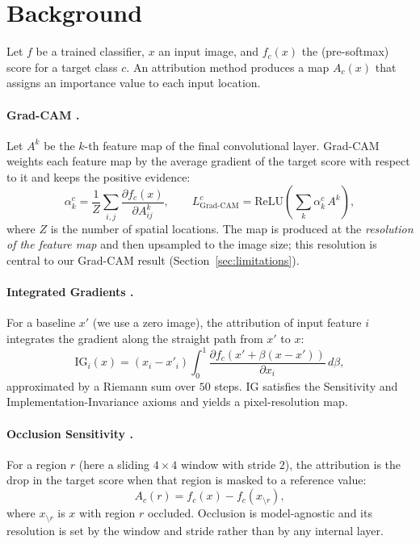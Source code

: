 \documentclass[11pt]{article}
\begin{document}
\section{Background}
\label{sec:background}
Let $f$ be a trained classifier, $x$ an input image, and $f_c(x)$ the (pre-softmax) score for a
target class $c$. An attribution method produces a map $A_c(x)$ that assigns an importance value to
each input location.

\paragraph{Grad-CAM \citep{selvaraju2017gradcam}.} Let $A^k$ be the $k$-th feature map of the final
convolutional layer. Grad-CAM weights each feature map by the average gradient of the target score
with respect to it and keeps the positive evidence:
\begin{equation}
\alpha_k^c = \frac{1}{Z}\sum_{i,j}\frac{\partial f_c(x)}{\partial A^k_{ij}},
\qquad
L^c_{\text{Grad-CAM}} = \mathrm{ReLU}\!\left(\sum_k \alpha_k^c\, A^k\right),
\end{equation}
where $Z$ is the number of spatial locations. The map is produced at the \emph{resolution of the
feature map} and then upsampled to the image size; this resolution is central to our Grad-CAM
result (Section~\ref{sec:limitations}).

\paragraph{Integrated Gradients \citep{sundararajan2017axiomatic}.} For a baseline $x'$ (we use a
zero image), the attribution of input feature $i$ integrates the gradient along the straight path
from $x'$ to $x$:
\begin{equation}
\mathrm{IG}_i(x) = (x_i - x'_i)\int_{0}^{1}
\frac{\partial f_c\!\left(x' + \beta (x - x')\right)}{\partial x_i}\, d\beta,
\end{equation}
approximated by a Riemann sum over $50$ steps. IG satisfies the Sensitivity and
Implementation-Invariance axioms and yields a pixel-resolution map.

\paragraph{Occlusion Sensitivity \citep{zeiler2014visualizing}.} For a region $r$ (here a sliding
$4\times4$ window with stride $2$), the attribution is the drop in the target score when that region
is masked to a reference value:
\begin{equation}
A_c(r) = f_c(x) - f_c\!\left(x_{\setminus r}\right),
\end{equation}
where $x_{\setminus r}$ is $x$ with region $r$ occluded. Occlusion is model-agnostic and its
resolution is set by the window and stride rather than by any internal layer.
\end{document}
